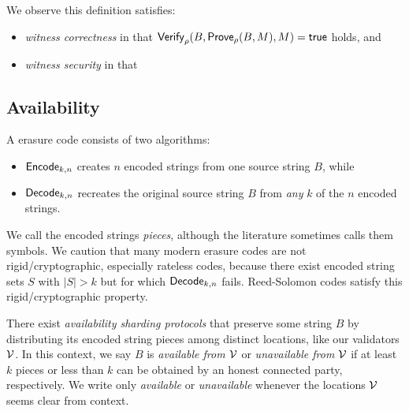 We observe this definition satisfies:
\begin{itemize}
\item {\em witness correctness} in that  $\mathsf{Verify}_{\rho}(B,\mathsf{Prove}_{\rho}(B,M),M) = \mathsf{true}$ holds, and
\item {\em witness security} in that 
\end{itemize}

\subsection{Availability}

A erasure code consists of two algorithms:
\begin{itemize}
\item $\mathsf{Encode}_{k,n}$ creates $n$ encoded strings from one source string $B$, while
\item $\mathsf{Decode}_{k,n}$ recreates the original source string $B$ from {\em any} $k$ of the $n$ encoded strings.
\end{itemize}
We call the encoded strings {\em pieces}, although the literature sometimes calls them symbols.  We caution that many modern erasure codes are not rigid/cryptographic, especially rateless codes, because there exist encoded string sets $S$ with $|S| > k$ but for which $\mathsf{Decode}_{k,n}$ fails.  Reed-Solomon codes satisfy this rigid/cryptographic property.

There exist {\em availability sharding protocols} that preserve some string $B$ by distributing its encoded string pieces among distinct locations, like our validators $\mathcal{V}$.  In this context, we say $B$ is {\em available from $\mathcal{V}$} or {\em unavailable from $\mathcal{V}$} if at least $k$ pieces or less than $k$ can be obtained by an honest connected party, respectively.  We write only  {\em available} or {\em unavailable} whenever the locations $\mathcal{V}$ seems clear from context.



